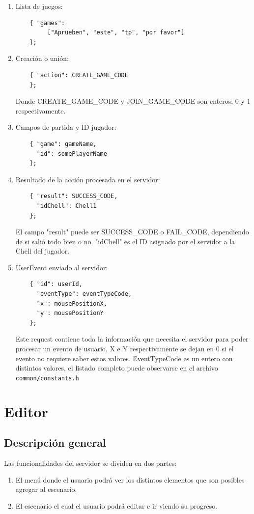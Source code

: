 \documentclass[a4paper]{article}
\begin{document}
\begin{enumerate}
	\item Lista de juegos:
	\begin{verbatim}
	{ "games":
		 ["Aprueben", "este", "tp", "por favor"]
	};
	\end{verbatim}
	\item Creación o unión:
	\begin{verbatim}
	{ "action": CREATE_GAME_CODE
	};
	\end{verbatim}
	Donde CREATE\_GAME\_CODE y JOIN\_GAME\_CODE son enteros, 0 y 1 respectivamente.
	\item Campos de partida y ID jugador:
	\begin{verbatim}
	{ "game": gameName,
	  "id": somePlayerName
	};
	\end{verbatim}
	\item Resultado de la acción procesada en el servidor:
	\begin{verbatim}
	{ "result": SUCCESS_CODE,
	  "idChell": Chell1
	};
	\end{verbatim}
	El campo "result" puede ser SUCCESS\_CODE o FAIL\_CODE, dependiendo de si salió todo bien o no. "idChell" es el ID asignado por el servidor a la Chell del jugador.
	\item UserEvent enviado al servidor:
	\begin{verbatim}
	{ "id": userId,
	  "eventType": eventTypeCode,
	  "x": mousePositionX,
	  "y": mousePositionY
	};
	\end{verbatim}
	Este request contiene toda la información que necesita el servidor para poder procesar un evento de usuario. X e Y respectivamente se dejan en 0 si el evento no requiere saber estos valores.
	EventTypeCode es un entero con distintos valores, el listado completo puede observarse en el archivo \texttt{common/constants.h}
\end{enumerate}

\section{Editor}

\subsection{Descripción general}

Las funcionalidades del servidor se dividen en dos partes:
\begin{enumerate}
\item El menú donde el usuario podrá ver los distintos elementos que son posibles agregar al escenario.
\item El escenario el cual el usuario podrá editar e ir viendo su progreso.
\end{enumerate}
\end{document}

